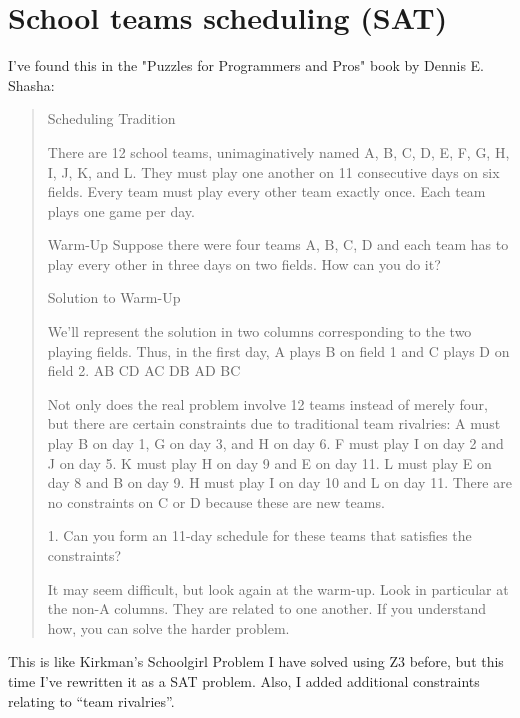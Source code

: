 \section{School teams scheduling (SAT)}

I've found this in the "Puzzles for Programmers and Pros" book by Dennis E. Shasha:

\begin{framed}
\begin{quotation}
Scheduling Tradition

There are 12 school teams, unimaginatively named A, B, C, D, E, F, G, H, I, J, K, and L. They must play one another on 11 consecutive days on six fields. 
Every team must play every other team exactly once. Each team plays one game per day.

        Warm-Up
                Suppose there were four teams A, B, C, D and each team has to play every other in three days on two fields. How can you do it?

        Solution to Warm-Up

                We’ll represent the solution in two columns corresponding to the two playing fields. Thus, in the first day, A plays B on field 1 and C plays D on field 2.
                AB CD
                AC DB
                AD BC

Not only does the real problem involve 12 teams instead of merely four, but there are certain constraints due to traditional team rivalries: 
A must play B on day 1, G on day 3, and H on day 6. F must play I on day 2 and J on day 5.  K must play H on day 9 and E on day 11. 
L must play E on day 8 and B on day 9. H must play I on day 10 and L on day 11. There are no constraints on C or D because these are new teams.

        1. Can you form an 11-day schedule for these teams that satisfies the constraints?

It may seem difficult, but look again at the warm-up. Look in particular at the non-A columns. They are related to one another.
If you understand how, you can solve the harder problem.
\end{quotation}
\end{framed}

This is like Kirkman's Schoolgirl Problem I have solved using Z3 before, but this time I've rewritten it as a SAT problem.
Also, I added additional constraints relating to ``team rivalries''.



